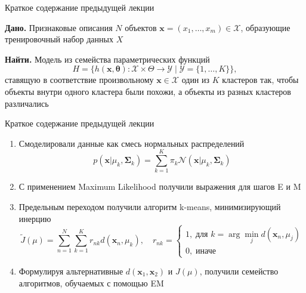 \documentclass[aspectratio=169]{beamer}
\let\otp\titlepage
\renewcommand{\titlepage}{\otp\addtocounter{framenumber}{-1}}
\begin{document}

\begin{frame}[plain]
\titlepage
\end{frame}

\begin{frame}{Краткое содержание предыдущей лекции}

\vspace{1em}
{\bf Дано.} Признаковые описания $N$ объектов $\mathbf{x} = (x_1, \ldots, x_m) \in \mathcal{X}$, образующие тренировочный набор данных $X$

\vspace{1em}
{\bf Найти.} Модель из семейства параметрических функций 
\[
H = \{h(\mathbf{x, \mathbf{\theta}}): \mathcal{X} \times \Theta \rightarrow \mathcal{Y} \mid \mathcal{Y} = \{1, \ldots, K\}\},
\]
ставящую в соответствие произвольному $\mathbf{x} \in \mathcal{X}$ один из $K$ кластеров так, чтобы объекты внутри одного кластера были похожи, а объекты из разных кластеров различались

\end{frame}

\begin{frame}{Краткое содержание предыдущей лекции}

\begin{enumerate}
\item Смоделировали данные как смесь нормальных распределений
\[
p(\mathbf{x} | \mu_k, \mathbf{\Sigma}_k) = \sum_{k=1}^K \pi_k \mathcal{N}(\mathbf{x} | \mu_k, \mathbf{\Sigma}_k)
\]
\item С применением Maximum Likelihood получили выражения для шагов E и M
\item Предельным переходом получили алгоритм k-means, минимизирующий инерцию
\[
\tilde J(\mu) = \sum_{n=1}^N \sum_{k=1}^K r_{nk} d(\mathbf{x}_n, \mu_k), \quad r_{nk} = \begin{cases}
1, \; \text{для } k = \arg \min_j d(\mathbf{x}_n, \mu_j) \\
0, \; \text{иначе}
\end{cases}
\]
\item Формулируя альтернативные $d(\mathbf{x}_1, \mathbf{x}_2)$ и $J(\mu)$, получили семейство алгоритмов, обучаемых с помощью EM
\end{enumerate}

\end{frame}
\end{document}
